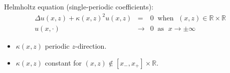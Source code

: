 \documentclass[10pt]{beamer}
\newcommand{\RR}{\mathbb{R}}
\begin{document}
\begin{frame}
\begin{block}{Helmholtz equation (single-periodic coefficients):}\vspace{-0.8cm}
\begin{eqnarray*}
  \Delta u(x,z)+\kappa(x,z)^2u(x,z)&=&0\;\; \textrm{when }\; (x,z)\in\RR\times\RR\\
  u(x,\cdot)&\rightarrow& 0\;\;\textrm{as }\; x\rightarrow\pm\infty
\end{eqnarray*}\vspace{-0.6cm}
\begin{itemize}
  \item $\kappa(x,z)$ periodic $z$-direction. 
  \item $\kappa(x,z)$ constant for $(x,z)\not\in[x_-,x_+]\times\RR$. 
\end{itemize}\vspace{-0.2cm}
\end{block}
\begin{overlayarea}{\textwidth}{4cm}\begin{center}
%
\end{center}
\end{overlayarea}
%

\end{frame}
\end{document}
